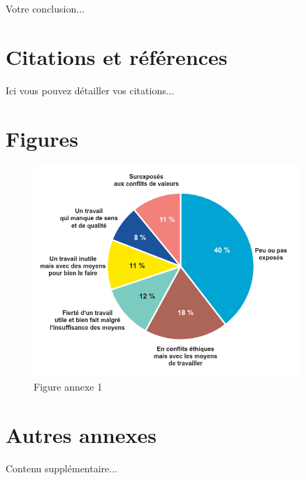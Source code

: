 \documentclass[12pt,a4paper]{report}
\begin{document}
Votre conclusion...

\printbibliography[heading=bibintoc,title=Bibliographie]

\appendix

\chapter{Citations et références}
Ici vous pouvez détailler vos citations...

\chapter{Figures}
\begin{figure}[h]
    \centering
    \includegraphics[width=0.9\textwidth]{./assets/conflits-de-valeurs-au-travail-graphique.png}
    \caption{Figure annexe 1}
\end{figure}

\chapter{Autres annexes}
Contenu supplémentaire...
\end{document}

